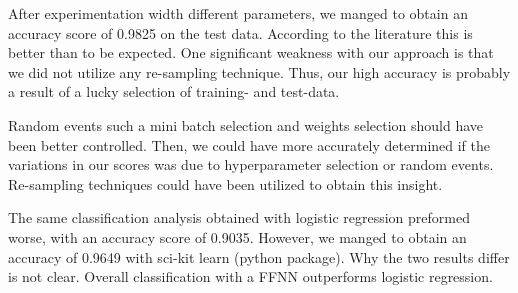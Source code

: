 After experimentation width different parameters, we manged to obtain an
accuracy score of 0.9825 on the test data. According to the literature this is
better than to be expected. One significant weakness with our approach is that
we did not utilize any re-sampling technique. Thus, our high accuracy is probably a
result of a lucky selection of training- and test-data. 

Random events such a mini batch selection and weights selection should have
been better controlled. Then, we could have more accurately determined if the
variations in our scores was due to hyperparameter selection or random events.
Re-sampling techniques could have been utilized to obtain this insight. 

The same classification analysis obtained with logistic regression preformed
worse, with an accuracy score of 0.9035. However, we manged to obtain an accuracy
of 0.9649 with sci-kit learn (python package). Why the two results differ is
not clear. Overall classification with a FFNN outperforms logistic regression. 






